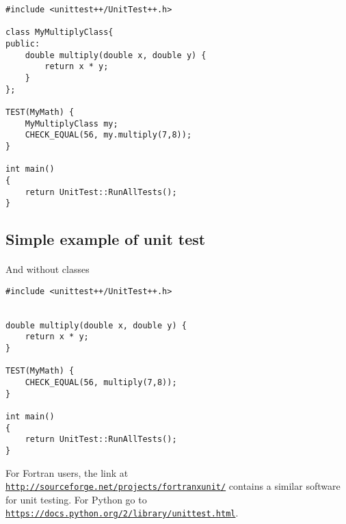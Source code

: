 \documentclass[%
oneside,                 %
final,                   %
10pt]{article}
\begin{document}
\begin{verbatim}
#include <unittest++/UnitTest++.h>

class MyMultiplyClass{
public:
    double multiply(double x, double y) {
        return x * y;
    }
};

TEST(MyMath) {
    MyMultiplyClass my;
    CHECK_EQUAL(56, my.multiply(7,8));
}

int main()
{
    return UnitTest::RunAllTests();
}

\end{verbatim}



\subsection*{Simple example of unit test}

\paragraph{}
And without classes
















\begin{verbatim}
#include <unittest++/UnitTest++.h>


double multiply(double x, double y) {
    return x * y;
}

TEST(MyMath) {
    CHECK_EQUAL(56, multiply(7,8));
}

int main()
{
    return UnitTest::RunAllTests();
} 

\end{verbatim}

For Fortran users, the link at \href{{http://sourceforge.net/projects/fortranxunit/}}{\nolinkurl{http://sourceforge.net/projects/fortranxunit/}} contains a similar
software for unit testing. For Python go to \href{{https://docs.python.org/2/library/unittest.html}}{\nolinkurl{https://docs.python.org/2/library/unittest.html}}.
\end{document}
